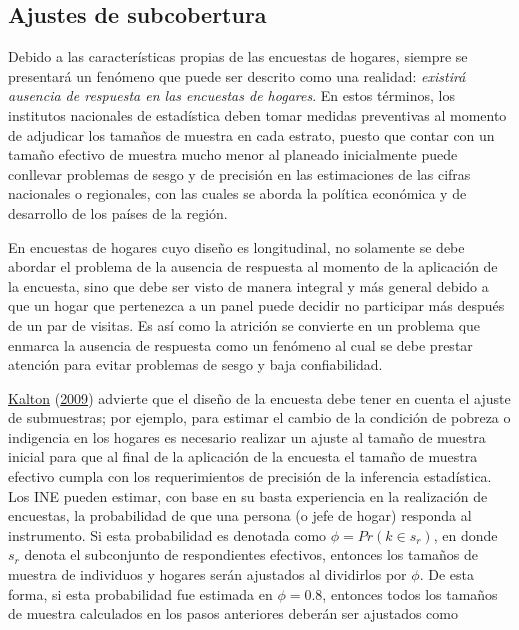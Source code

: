 \documentclass[
  12pt,
  spanish,
]{book}
\begin{document}
\hypertarget{ajustes-de-subcobertura}{%
\subsection{Ajustes de subcobertura}\label{ajustes-de-subcobertura}}

Debido a las características propias de las encuestas de hogares, siempre se presentará un fenómeno que puede ser descrito como una realidad: \emph{existirá ausencia de respuesta en las encuestas de hogares}. En estos términos, los institutos nacionales de estadística deben tomar medidas preventivas al momento de adjudicar los tamaños de muestra en cada estrato, puesto que contar con un tamaño efectivo de muestra mucho menor al planeado inicialmente puede conllevar problemas de sesgo y de precisión en las estimaciones de las cifras nacionales o regionales, con las cuales se aborda la política económica y de desarrollo de los países de la región.

En encuestas de hogares cuyo diseño es longitudinal, no solamente se debe abordar el problema de la ausencia de respuesta al momento de la aplicación de la encuesta, sino que debe ser visto de manera integral y más general debido a que un hogar que pertenezca a un panel puede decidir no participar más después de un par de visitas. Es así como la atrición se convierte en un problema que enmarca la ausencia de respuesta como un fenómeno al cual se debe prestar atención para evitar problemas de sesgo y baja confiabilidad.

\protect\hyperlink{ref-Kalton_2009}{Kalton} (\protect\hyperlink{ref-Kalton_2009}{2009}) advierte que el diseño de la encuesta debe tener en cuenta el ajuste de submuestras; por ejemplo, para estimar el cambio de la condición de pobreza o indigencia en los hogares es necesario realizar un ajuste al tamaño de muestra inicial para que al final de la aplicación de la encuesta el tamaño de muestra efectivo cumpla con los requerimientos de precisión de la inferencia estadística. Los INE pueden estimar, con base en su basta experiencia en la realización de encuestas, la probabilidad de que una persona (o jefe de hogar) responda al instrumento. Si esta probabilidad es denotada como \(\phi=Pr(k \in s_r)\), en donde \(s_r\) denota el subconjunto de respondientes efectivos, entonces los tamaños de muestra de individuos y hogares serán ajustados al dividirlos por \(\phi\). De esta forma, si esta probabilidad fue estimada en \(\phi = 0.8\), entonces todos los tamaños de muestra calculados en los pasos anteriores deberán ser ajustados como
\end{document}
